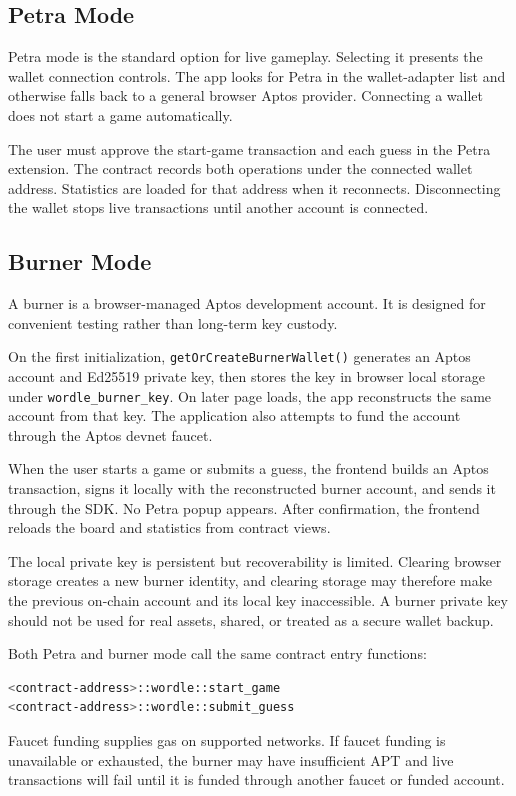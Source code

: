 \documentclass[10pt]{article}
\begin{document}
\subsection{Petra Mode}

Petra mode is the standard option for live gameplay. Selecting it presents the wallet connection controls. The app looks for Petra in the wallet-adapter list and otherwise falls back to a general browser Aptos provider. Connecting a wallet does not start a game automatically.

The user must approve the start-game transaction and each guess in the Petra extension. The contract records both operations under the connected wallet address. Statistics are loaded for that address when it reconnects. Disconnecting the wallet stops live transactions until another account is connected.

\subsection{Burner Mode}

A burner is a browser-managed Aptos development account. It is designed for convenient testing rather than long-term key custody.

On the first initialization, \texttt{getOrCreateBurnerWallet()} generates an Aptos account and Ed25519 private key, then stores the key in browser local storage under \texttt{wordle\_burner\_key}. On later page loads, the app reconstructs the same account from that key. The application also attempts to fund the account through the Aptos devnet faucet.

When the user starts a game or submits a guess, the frontend builds an Aptos transaction, signs it locally with the reconstructed burner account, and sends it through the SDK. No Petra popup appears. After confirmation, the frontend reloads the board and statistics from contract views.

The local private key is persistent but recoverability is limited. Clearing browser storage creates a new burner identity, and clearing storage may therefore make the previous on-chain account and its local key inaccessible. A burner private key should not be used for real assets, shared, or treated as a secure wallet backup.

Both Petra and burner mode call the same contract entry functions:
\begin{lstlisting}[language=bash]
<contract-address>::wordle::start_game
<contract-address>::wordle::submit_guess
\end{lstlisting}
Faucet funding supplies gas on supported networks. If faucet funding is unavailable or exhausted, the burner may have insufficient APT and live transactions will fail until it is funded through another faucet or funded account.
\end{document}
